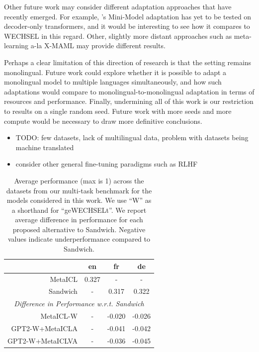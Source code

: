 \documentclass[11pt]{article}
\begin{document}
Other future work may consider different adaptation approaches that have recently emerged. For
example, \citet{marchisio_mini-model_2022}'s Mini-Model adaptation has yet to be tested on
decoder-only transformers, and it would be interesting to see how it compares to WECHSEL in this
regard. Other, slightly more distant approaches such as meta-learning a-la X-MAML
\citep{nooralahzadeh_zero-shot_2020} may provide different results.

Perhaps a clear limitation of this direction of research is that the setting remains monolingual.
Future work could explore whether it is possible to adapt a monolingual model to multiple languages
simultaneously, and how such adaptations would compare to monolingual-to-monolingual adaptation in
terms of resources and performance. Finally, undermining all of this work is our restriction to
results on a single random seed. Future work with more seeds and more compute would be necessary to
draw more definitive conclusions.

\begin{itemize}
	\item TODO: few datasets, lack of multilingual data, problem with datasets being machine
	      translated
	\item consider other general fine-tuning paradigms such as RLHF
\end{itemize}

\begin{table}[ht]
	\centering
	\caption{Average performance (max is 1) across the datasets from our multi-task benchmark for the
		models considered in this work. We use ``W'' as a shorthand for ``geWECHSELt''. We report average
		difference in performance for each proposed alternative to Sandwich. Negative values indicate
		underperformance compared to Sandwich.}
	\label{tab:results-summary}
	\begin{tabular}{@{}rccc@{}}
		\toprule
		\multicolumn{1}{c}{} & en    & fr     & de                             \\ \midrule
		MetaICL              & 0.327 & -      & -                              \\
		Sandwich             & -     & 0.317  & 0.322                          \\ \midrule
		\multicolumn{4}{c}{\textit{Difference in Performance w.r.t. Sandwich}} \\
		MetaICL-W            & -     & -0.020 & -0.026                         \\
		GPT2-W+MetaICLA      & -     & -0.041 & -0.042                         \\
		GPT2-W+MetaICLVA     & -     & -0.036 & -0.045                         \\ \bottomrule
	\end{tabular}
\end{table}
\end{document}
